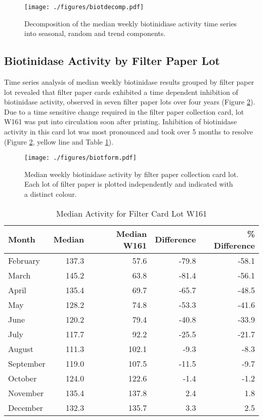 \documentclass[review]{elsarticle}
\begin{document}
\begin{figure}[htbp]
\centering
\texttt{[image: ./figures/biotdecomp.pdf]}
\caption{\label{fig:orgc23c2c6}Decomposition of the median weekly biotinidiase activity time series into seasonal, random and trend components.}
\end{figure}

\clearpage

\subsection*{Biotinidase Activity by Filter Paper Lot}
\label{sec:org0c05a8a}
Time series analysis of median weekly biotinidase results grouped by
filter paper lot revealed that filter paper cards exhibited a time
dependent inhibition of biotinidase activity, observed in seven filter
paper lots over four years (Figure \ref{fig:org321fef1}). Due to a time sensitive
change required in the filter paper collection card, lot W161 was put into
circulation soon after printing. Inhibition of biotinidase activity in
this card lot was most pronounced and took over 5 months to resolve
(Figure \ref{fig:org321fef1}, yellow line and Table \ref{tab:w161_months}).

\begin{figure}[htbp]
\centering
\texttt{[image: ./figures/biotform.pdf]}
\caption{\label{fig:org321fef1}Median weekly biotinidase activity by filter paper collection card lot. Each lot of filter paper is plotted independently and indicated with a distinct colour.}
\end{figure}

\clearpage

\begin{table}[ht]
\centering
\begin{tabular}{lrrrr}
  \hline
Month & Median & Median W161 & Difference & \% Difference \\ 
  \hline
February & 137.3 & 57.6 & -79.8 & -58.1 \\ 
  March & 145.2 & 63.8 & -81.4 & -56.1 \\ 
  April & 135.4 & 69.7 & -65.7 & -48.5 \\ 
  May & 128.2 & 74.8 & -53.3 & -41.6 \\ 
  June & 120.2 & 79.4 & -40.8 & -33.9 \\ 
  July & 117.7 & 92.2 & -25.5 & -21.7 \\ 
  August & 111.3 & 102.1 & -9.3 & -8.3 \\ 
  September & 119.0 & 107.5 & -11.5 & -9.7 \\ 
  October & 124.0 & 122.6 & -1.4 & -1.2 \\ 
  November & 135.4 & 137.8 & 2.4 & 1.8 \\ 
  December & 132.3 & 135.7 & 3.3 & 2.5 \\ 
   \hline
\end{tabular}
\caption{Median Activity for Filter Card Lot W161} 
\label{tab:w161_months}
\end{table}
\end{document}
